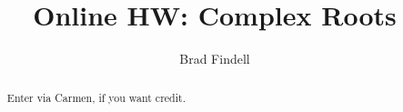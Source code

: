 \documentclass[handout,space,nooutcomes]{xourse}
\title{Online HW: Complex Roots}
\author{Brad Findell}
\begin{document}
\begin{abstract}
Enter via Carmen, if you want credit.  
\end{abstract}
\maketitle

{}
\end{document}
